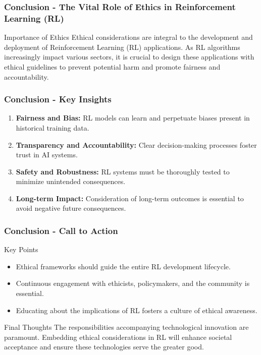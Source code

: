 \documentclass[aspectratio=169]{beamer}
\begin{document}
\begin{frame}[fragile]
    \frametitle{Conclusion - The Vital Role of Ethics in Reinforcement Learning (RL)}
    \begin{block}{Importance of Ethics}
        Ethical considerations are integral to the development and deployment of Reinforcement Learning (RL) applications. As RL algorithms increasingly impact various sectors, it is crucial to design these applications with ethical guidelines to prevent potential harm and promote fairness and accountability.
    \end{block}
\end{frame}

\begin{frame}[fragile]
    \frametitle{Conclusion - Key Insights}
    \begin{enumerate}
        \item \textbf{Fairness and Bias:} 
        RL models can learn and perpetuate biases present in historical training data.
        \item \textbf{Transparency and Accountability:} 
        Clear decision-making processes foster trust in AI systems.
        \item \textbf{Safety and Robustness:} 
        RL systems must be thoroughly tested to minimize unintended consequences.
        \item \textbf{Long-term Impact:} 
        Consideration of long-term outcomes is essential to avoid negative future consequences.
    \end{enumerate}
\end{frame}

\begin{frame}[fragile]
    \frametitle{Conclusion - Call to Action}
    \begin{block}{Key Points}
        \begin{itemize}
            \item Ethical frameworks should guide the entire RL development lifecycle.
            \item Continuous engagement with ethicists, policymakers, and the community is essential.
            \item Educating about the implications of RL fosters a culture of ethical awareness.
        \end{itemize}
    \end{block}
    
    \begin{block}{Final Thoughts}
        The responsibilities accompanying technological innovation are paramount. Embedding ethical considerations in RL will enhance societal acceptance and ensure these technologies serve the greater good.
    \end{block}
\end{frame}
\end{document}
